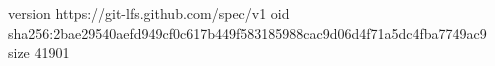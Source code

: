 version https://git-lfs.github.com/spec/v1
oid sha256:2bae29540aefd949cf0c617b449f583185988cac9d06d4f71a5dc4fba7749ac9
size 41901
